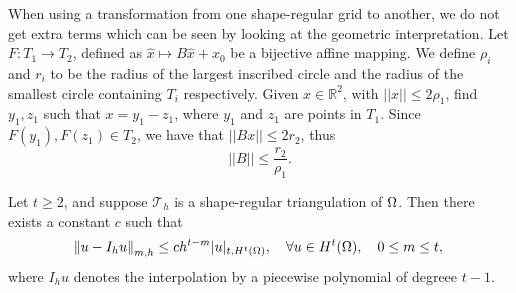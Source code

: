 When using a transformation from one shape-regular grid to another, we do not get extra terms which can be seen by looking at the geometric interpretation.
Let $F:T_1 \to T_2$, defined as $ \hat{x} \mapsto B\hat{x} + x_0$ be a bijective affine mapping. 
We define $\rho_i$ and $r_i$ to be the radius of the largest inscribed circle and the radius of the smallest circle containing $T_i$ respectively.
Given $x \in \mathbb{R}^2$, with $||x|| \leq 2 \rho_1$, find $y_1, z_1$ such that $x = y_1 - z_1$, where $y_1$ and $z_1$ are points in $T_1$. 
Since $F(y_1), F(z_1) \in T_2$, we have that $||Bx|| \leq 2r_2$, thus
\begin{equation}\label{eq:6.9}
    ||B|| \leq \frac{r_2}{\rho_1}.
\end{equation}
\begin{thmx}{\quad\label{thm:6.4}}
    Let $t \geq 2$, and suppose $\mathcal{T}_h$ is a shape-regular triangulation of $\Omega$. Then there exists a constant $c$ such that
    \begin{equation}
        \norm{u - I_h u}_{m,h} \leq c h^{t-m} |u|_{t, H^t(\Omega)}, \quad \forall u \in H^t(\Omega), \quad 0 \leq m \leq t,
        \label{eq:6.5}
    \end{equation}
    where $I_h u$ denotes the interpolation by a piecewise polynomial of degreee $t-1$.
\end{thmx}

